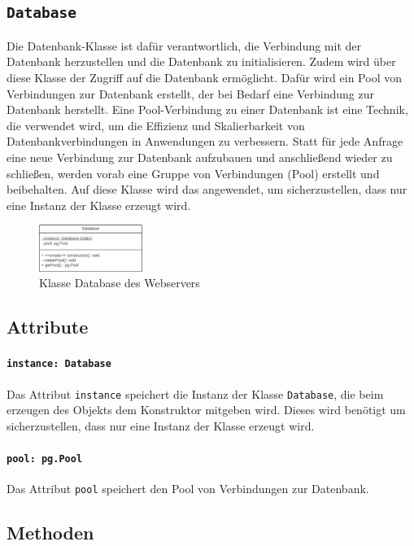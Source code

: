 \documentclass{entwurfsheft}
\begin{document}
\subsection{\texttt{Database}}\label{sec:Database}
Die Datenbank-Klasse ist dafür verantwortlich, die Verbindung mit der Datenbank herzustellen und die Datenbank zu initialisieren.
Zudem wird über diese Klasse der Zugriff auf die Datenbank ermöglicht.
Dafür wird ein Pool von Verbindungen zur Datenbank erstellt, der bei Bedarf eine Verbindung zur Datenbank herstellt.
Eine Pool-Verbindung zu einer Datenbank ist eine Technik, die verwendet wird, um die Effizienz und Skalierbarkeit von Datenbankverbindungen in Anwendungen zu verbessern.
Statt für jede Anfrage eine neue Verbindung zur Datenbank aufzubauen und anschließend wieder zu schließen, werden vorab eine Gruppe von Verbindungen (Pool) erstellt und beibehalten.
Auf diese Klasse wird das  angewendet, um sicherzustellen, dass nur eine Instanz der Klasse erzeugt wird.

\begin{figure}[htp]
    \centering
    \includegraphics[width = 0.3\textwidth]{images/webserver/database.pdf}
    \caption{Klasse Database des Webservers}
    \label{fig:database}
\end{figure}

\subsection*{Attribute}
\paragraph{\texttt{instance: Database}}
Das Attribut \texttt{instance} speichert die Instanz der Klasse \texttt{Database}, die beim erzeugen des Objekts dem Konstruktor mitgeben wird.
Dieses wird benötigt um sicherzustellen, dass nur eine Instanz der Klasse erzeugt wird.
\paragraph{\texttt{pool: pg.Pool}}
Das Attribut \texttt{pool} speichert den Pool von Verbindungen zur Datenbank.
\subsection*{Methoden}
\end{document}
